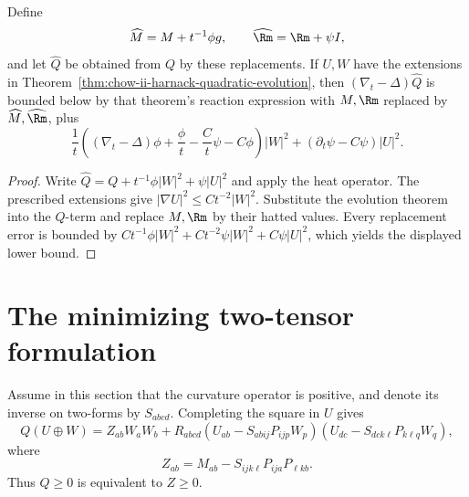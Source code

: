 \begin{lemma}
\label{lem:chow-ii-perturbed-harnack-evolution}
Define
\[
\widehat{M}=M+t^{-1}\phi g,\qquad \widehat{\Rm}=\Rm+\psi I,
\]
and let \(\widehat Q\) be obtained from \(Q\) by these replacements.  If
\(U,W\) have the extensions in
Theorem~\ref{thm:chow-ii-harnack-quadratic-evolution}, then
\((\nabla_t-\Delta)\widehat Q\) is bounded below by that theorem's reaction
expression with \(M,\Rm\) replaced by \(\widehat{M},\widehat{\Rm}\), plus
\[
\frac1t\left((\nabla_t-\Delta)\phi+\frac\phi t-\frac C t\psi-C\phi\right)|W|^2
+(\partial_t\psi-C\psi)|U|^2.
\]
\end{lemma}
\begin{proof}
\sketch Write \(\widehat Q=Q+t^{-1}\phi|W|^2+\psi|U|^2\) and apply the heat
operator.  The prescribed extensions give
\(|\nabla U|^2\le Ct^{-2}|W|^2\).  Substitute the evolution theorem into the
\(Q\)-term and replace \(M,\Rm\) by their hatted values.  Every replacement
error is bounded by \(Ct^{-1}\phi|W|^2+Ct^{-2}\psi|W|^2+C\psi|U|^2\),
which yields the displayed lower bound.
\end{proof}

\section{The minimizing two-tensor formulation}

Assume in this section that the curvature operator is positive, and denote its
inverse on two-forms by \(S_{abcd}\).  Completing the square in \(U\) gives
\[
Q(U\oplus W)=Z_{ab}W_aW_b
+R_{abcd}(U_{ab}-S_{abij}P_{ijp}W_p)
 (U_{dc}-S_{dck\ell}P_{k\ell q}W_q),
\]
where
\[
Z_{ab}=M_{ab}-S_{ijk\ell}P_{ija}P_{\ell kb}.
\]
Thus \(Q\ge0\) is equivalent to \(Z\ge0\).

